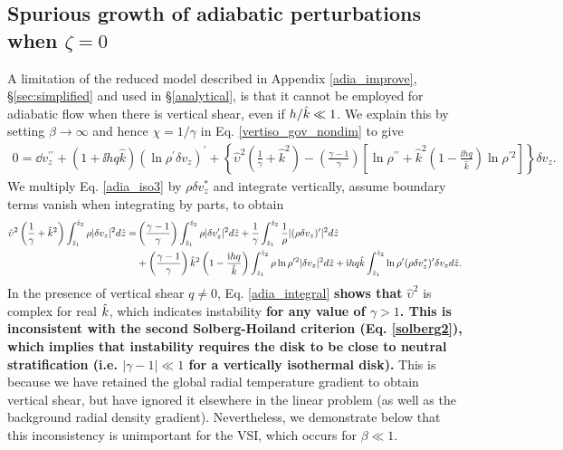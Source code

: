 \subsection{Spurious growth of adiabatic perturbations when
  $\zeta=0$}\label{analytic_adia}  
A limitation of the reduced model described in Appendix
\ref{adia_improve}, \S\ref{sec:simplified} and used in \S\ref{analytical}, is that it
cannot be employed for adiabatic flow when there is vertical shear, even
if $h/\hat{k}\ll1$.  We explain this by setting  $\beta\to\infty$ and hence $\chi = 1/\gamma$ in 
Eq. \ref{vertiso_gov_nondim} %
to give 
\begin{align}
  0 =\dd v_z^{\prime\prime} + \left(1 + \ii h q
    \hat{k}\right)\left(\ln\rho^{\prime}\delta v_z\right)^\prime
  +\left\{\hat{\upsilon}^2\left(\frac{1}{\gamma}+\hat{k}^2\right) 
    -\left(\frac{\gamma-1}{\gamma}\right)\left[\ln\rho^{\prime\prime}+\hat{k}^2\left(1-\frac{\ii h  
          q}{\hat{k}}\right)\ln\rho^{\prime 2}\right]\right\}\delta v_z.\label{adia_iso3}
\end{align}
We multiply Eq. \ref{adia_iso3} by $\rho\delta v_z^*$ and
integrate vertically, assume boundary terms vanish when integrating by
parts, to obtain
\begin{align}
  \hat{\upsilon}^2\left(\frac{1}{\gamma} +
    \hat{k}^2\right)\int_{\hat{z}_1}^{\hat{z}_2}\rho|\delta
  v_z|^2 d\hat{z} 
  =&  \left(\frac{\gamma-1}{\gamma}\right)
  \int_{\hat{z}_1}^{\hat{z}_2}\rho|\delta v_z^\prime|^2 d\hat{z}
  +\frac{1}{\gamma}\int_{\hat{z}_1}^{\hat{z}_2}\frac{1}{\rho}|(\rho\delta
  v_z)^\prime|^2 d\hat{z}\notag\\
&+
  \left(\frac{\gamma-1}{\gamma}\right)\hat{k}^2\left(1-\frac{\mathrm{i} h
      q}{\hat{k}}\right) \int_{\hat{z}_1}^{\hat{z}_2}\rho\ln\rho^{\prime
    2}|\delta v_z|^2 d\hat{z}
+ \mathrm{i} h q \hat{k}
  \int_{\hat{z}_1}^{\hat{z}_2}\ln\rho^\prime(\rho\delta v_z^*)^\prime
  \delta v_z d\hat{z}.\label{adia_integral}
\end{align}
In the presence of vertical shear $q\neq0$, Eq. \ref{adia_integral}
{\bf shows that} $\hat{\upsilon}^2$ is complex for real $\hat{k}$, which
indicates instability {\bf for any value of  $\gamma>1$. This is inconsistent
  with the second Solberg-Hoiland criterion  
(Eq. \ref{solberg2}), which implies that instability requires the disk
to be close to neutral stratification (i.e. $|\gamma-1|\ll 1$ for a
vertically isothermal disk).} 
This is because we have retained the global radial temperature 
gradient to obtain vertical shear, 
but have ignored it elsewhere in the linear problem (as well as the
background radial density gradient). Nevertheless, we demonstrate below
that this inconsistency is unimportant for the VSI, which occurs 
for $\beta\ll1$.   %

